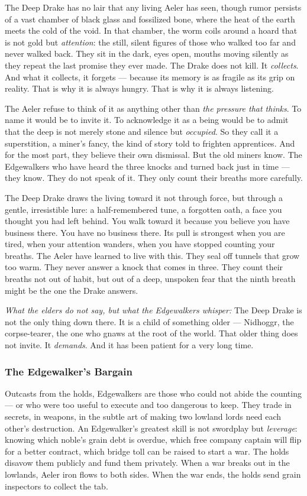 The Deep Drake has no lair that any living Aeler has seen, though rumor persists of a vast chamber of black glass and fossilized bone, where the heat of the earth meets the cold of the void. In that chamber, the worm coils around a hoard that is not gold but \textit{attention}: the still, silent figures of those who walked too far and never walked back. They sit in the dark, eyes open, mouths moving silently as they repeat the last promise they ever made. The Drake does not kill. It \textit{collects}. And what it collects, it forgets --- because its memory is as fragile as its grip on reality. That is why it is always hungry. That is why it is always listening.

The Aeler refuse to think of it as anything other than \textit{the pressure that thinks}. To name it would be to invite it. To acknowledge it as a being would be to admit that the deep is not merely stone and silence but \textit{occupied}. So they call it a superstition, a miner's fancy, the kind of story told to frighten apprentices. And for the most part, they believe their own dismissal. But the old miners know. The Edgewalkers who have heard the three knocks and turned back just in time --- they know. They do not speak of it. They only count their breaths more carefully.

The Deep Drake draws the living toward it not through force, but through a gentle, irresistible lure: a half-remembered tune, a forgotten oath, a face you thought you had left behind. You walk toward it because you believe you have business there. You have no business there. Its pull is strongest when you are tired, when your attention wanders, when you have stopped counting your breaths. The Aeler have learned to live with this. They seal off tunnels that grow too warm. They never answer a knock that comes in three. They count their breaths not out of habit, but out of a deep, unspoken fear that the ninth breath might be the one the Drake answers.

\textit{What the elders do not say, but what the Edgewalkers whisper:} The Deep Drake is not the only thing down there. It is a child of something older --- Nidhoggr, the corpse-tearer, the one who gnaws at the root of the world. That older thing does not invite. It \textit{demands}. And it has been patient for a very long time.

\subsubsection*{The Edgewalker's Bargain}
Outcasts from the holds, Edgewalkers are those who could not abide the counting --- or who were too useful to execute and too dangerous to keep. They trade in secrets, in weapons, in the subtle art of making two lowland lords need each other's destruction. An Edgewalker's greatest skill is not swordplay but \textit{leverage}: knowing which noble's grain debt is overdue, which free company captain will flip for a better contract, which bridge toll can be raised to start a war. The holds disavow them publicly and fund them privately. When a war breaks out in the lowlands, Aeler iron flows to both sides. When the war ends, the holds send grain inspectors to collect the tab.

